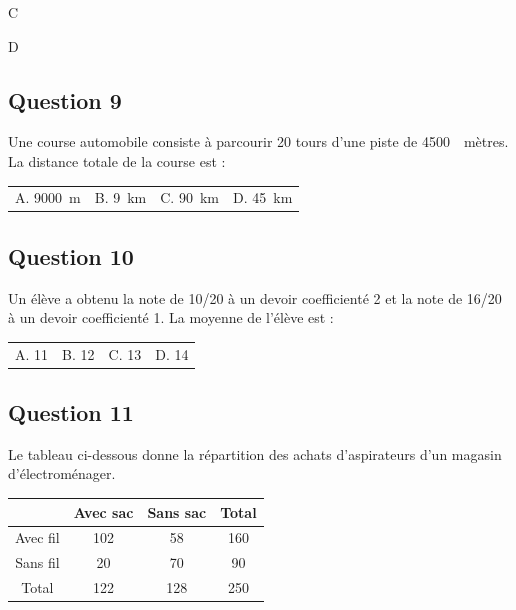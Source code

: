 \documentclass[10pt]{article}
\providecommand{\np}[2][]{{#2~#1}}
\begin{document}
C


D



\subsection*{Question 9}

Une course automobile consiste à parcourir 20 tours d'une piste de \np{4500}~mètres. La distance totale de la course est :
\begin{center}
\begin{tabularx}{.92\linewidth}{XXXX} A. \np[m]{9000} & B. \np[km]{9} & C. \np[km]{90} & D. \np[km]{45}
\end{tabularx}
\end{center}

\vspace{.8em}

\subsection*{Question 10}

Un élève a obtenu la note de 10/20 à un devoir coefficienté 2 et la note de 16/20 à un devoir coefficienté 1. La moyenne de l'élève est :
\begin{center}
\begin{tabularx}{.92\linewidth}{XXXX} A. 11 & B. 12 & C. 13 & D. 14\end{tabularx}
\end{center}

\vspace{.8em}

\subsection*{Question 11}

Le tableau ci-dessous donne la répartition des achats d'aspirateurs d'un magasin d'électroménager.
\begin{center}
\renewcommand{\arraystretch}{1.25}
\begin{tabular}{|c|c|c|c|}\hline
& Avec sac & Sans sac & Total\\\hline
Avec fil & 102 & 58 & 160\\\hline
Sans fil & 20 & 70 & 90\\\hline
Total & 122 & 128 & 250\\\hline
\end{tabular}
\end{center}
\end{document}
